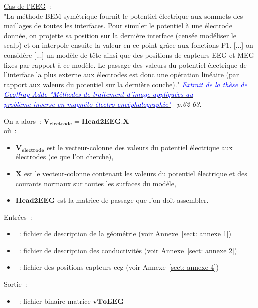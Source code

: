 \checkItem \underline{Cas de l'EEG}~:\\
"La méthode BEM symétrique fournit le potentiel électrique aux sommets des maillages de toutes les interfaces. Pour simuler le
potentiel à une électrode donnée, on projette sa position sur la dernière interface (censée modéliser le scalp) et on interpole
ensuite la valeur en ce point grâce aux fonctions P1.  [...] on considère [...] un modèle de tête ainsi que des positions de
capteurs EEG et MEG fixes par rapport à ce modèle. Le passage des valeurs du potentiel électrique de l'interface la plus externe
aux électrodes est donc une opération linéaire (par rapport aux valeurs du potentiel sur la dernière couche)."
\emph{\underline{\textcolor{blue}{Extrait de la thèse de Geoffray Adde "Méthodes de traitement d'image appliquées au}}}\\
\emph{\underline{\textcolor{blue}{problème inverse en magnéto-électro-encéphalographie"}}  p.62-63.}

\medskip

\noindent
On a alors~: $\mathbf{V_{electrode}} = \mathbf{Head2EEG} . \mathbf{X}$\\
où~:\\ 
\begin{itemize}
    \item $\mathbf{V_{electrode}}$ est le vecteur-colonne des valeurs du potentiel électrique aux électrodes (ce que l'on cherche),
    \item $\mathbf{X}$ est le vecteur-colonne contenant les valeurs du potentiel électrique et des courants normaux sur toutes les surfaces du modèle,
    \item $\mathbf{Head2EEG}$ est la matrice de passage que l'on doit assembler.
\end{itemize}

\bigskip

\noindent
Entrées~:
\begin{itemize}
    \item {}~: fichier de description de la géométrie (voir Annexe~\ref{sect: annexe 1})
    \item {}~: fichier de description des conductivités (voir Annexe~\ref{sect: annexe 2})
    \item {}~: fichier des positions capteurs eeg (voir Annexe~\ref{sect: annexe 4})
\end{itemize}
Sortie~:
\begin{itemize}
    \item {}~: fichier binaire matrice $\mathbf{vToEEG}$
\end{itemize}

